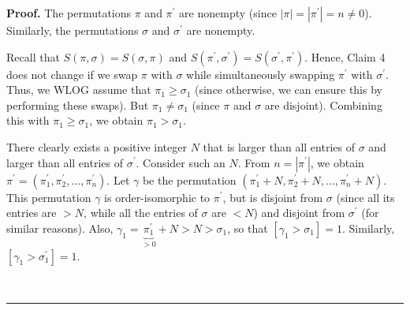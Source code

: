 \documentclass[numbers=enddot,12pt,final,onecolumn,notitlepage]{scrartcl}%
\theoremstyle{definition}
\newenvironment{proof}[1][Proof]{\noindent\textbf{#1.} }{\ \rule{0.5em}{0.5em}}
\newenvironment{verlong}{}{}
\begin{document}
\begin{verlong}
\begin{proof}
The permutations $\pi$ and $\pi^{\prime}$ are nonempty (since $\left\vert
\pi\right\vert =\left\vert \pi^{\prime}\right\vert =n\neq0$). Similarly, the
permutations $\sigma$ and $\sigma^{\prime}$ are nonempty.

Recall that $S\left(  \pi,\sigma\right)  =S\left(
\sigma,\pi\right)  $ and $S\left(  \pi^{\prime},\sigma^{\prime}\right)
=S\left(  \sigma^{\prime},\pi^{\prime}\right)  $. Hence, Claim 4 does not
change if we swap $\pi$ with $\sigma$ while simultaneously swapping
$\pi^{\prime}$ with $\sigma^{\prime}$. Thus, we WLOG assume that $\pi_{1}%
\geq\sigma_{1}$ (since otherwise, we can ensure this by performing these
swaps). But $\pi_{1}\neq\sigma_{1}$ (since $\pi$ and $\sigma$ are disjoint).
Combining this with $\pi_{1}\geq\sigma_{1}$, we obtain $\pi_{1}>\sigma_{1}$.

There clearly exists a positive integer $N$ that is larger than all entries of
$\sigma$ and larger than all entries of $\sigma^{\prime}$. Consider such an
$N$. From $n=\left\vert \pi^{\prime}\right\vert $, we obtain $\pi^{\prime
}=\left(  \pi_{1}^{\prime},\pi_{2}^{\prime},\ldots,\pi_{n}^{\prime}\right)  $.
Let $\gamma$ be the permutation $\left(  \pi_{1}^{\prime}+N,\pi_{2}^{\prime
}+N,\ldots,\pi_{n}^{\prime}+N\right)  $. This permutation $\gamma$ is
order-isomorphic to $\pi^{\prime}$, but is disjoint from $\sigma$ (since all
its entries are $>N$, while all the entries of $\sigma$ are $<N$) and disjoint
from $\sigma^{\prime}$ (for similar reasons). Also, $\gamma_{1}%
=\underbrace{\pi_{1}^{\prime}}_{>0}+N>N>\sigma_{1}$, so that $\left[
\gamma_{1}>\sigma_{1}\right]  =1$. Similarly, $\left[  \gamma_{1}>\sigma
_{1}^{\prime}\right]  =1$.


\end{proof}
\end{verlong}
\end{document}
